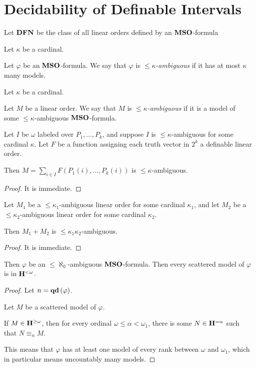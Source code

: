 \section{Decidability of Definable Intervals}

\begin{definition}
    Let $\mathbf{DFN}$ be the class of all linear orders defined
    by an $\mathbf{MSO}$-formula
\end{definition}

\begin{definition}
    Let $\kappa$ be a cardinal.

    Let $\varphi$ be an $\mathbf{MSO}$-formula.
    We say that $\varphi$ is \emph{$\le \kappa$-ambiguous}
    if it has at most $\kappa$ many models.
\end{definition}

\begin{definition}
    Let $\kappa$ be a cardinal.

    Let $M$ be a linear order.
    We say that $M$ is \emph{$\le \kappa$-ambiguous}
    if it is a model of some $\le \kappa$-ambiguous $\mathbf{MSO}$-formula.
\end{definition}

\begin{lemma}
    Let $I$ be $\omega$ labeled over $P_1, \ldots, P_k$, and suppose $I$ is $\le \kappa$-ambiguous for some cardinal $\kappa$.
    Let $F$ be a function assigning each truth vector in $2^k$ a definable linear order.

    Then $M = \sum_{i \in I} F(P_1(i), \ldots, P_k(i))$ is $\le \kappa$-ambiguous.
\end{lemma}

\begin{proof}
    It is immediate.
\end{proof}

\begin{lemma}
    Let $M_1$ be a $\le \kappa_1$-ambiguous linear order for some cardinal $\kappa_1$,
    and let $M_2$ be a $\le \kappa_2$-ambiguous linear order for some cardinal $\kappa_2$.

    Then $M_1 + M_2$ is $\le \kappa_1 \kappa_2$-ambiguous.
\end{lemma}

\begin{proof}
    It is immediate.
\end{proof}

\begin{lemma}
    Then $\varphi$ be an $\le \aleph_0$-ambiguous $\mathbf{MSO}$-formula.
    Then every scattered model
    of $\varphi$ is in $\mathbf{H}^{< \omega}$.
\end{lemma}
\begin{proof}
    Let $n = \mathbf{qd} \left( {\varphi} \right)$.

    Let $M$ be a scattered model of $\varphi$.

    If $M \in \mathbf{H}^{\ge \omega}$,
    then for every ordinal $\omega \le \alpha < \omega_1$,
    there is some $N \in \mathbf{H}^{= \alpha}$
    such that $N \equiv_n M$.

    This means that $\varphi$ has at least one model
    of every rank between $\omega$ and $\omega_1$,
    which in particular means uncountably many models.
\end{proof}

